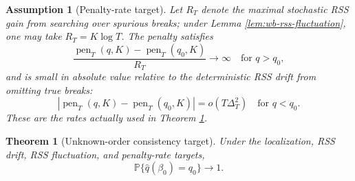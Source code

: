 \documentclass[12pt]{article}
\numberwithin{equation}{section}
\newtheorem{theorem}{Theorem}
\newtheorem{assumption}{Assumption}
\theoremstyle{definition}
\newcommand{\Pp}{\mathbb P}
\begin{document}
\begin{assumption}[Penalty-rate target]
\label{ass:wb-penalty}
Let \(R_T\) denote the maximal stochastic RSS gain from searching over
spurious breaks; under Lemma \ref{lem:wb-rss-fluctuation}, one may take
\(R_T=K\log T\).  The penalty satisfies
\[
    \frac{\operatorname{pen}_T(q,K)-\operatorname{pen}_T(q_0,K)}{R_T}
    \to\infty
    \quad\text{for }q>q_0,
\]
and is small in absolute value relative to the deterministic RSS drift from
omitting true breaks:
\[
    \left|\operatorname{pen}_T(q,K)-\operatorname{pen}_T(q_0,K)\right|
    =o(T\Delta_T^2)
    \quad\text{for }q<q_0.
\]
These are the rates actually used in Theorem \ref{thm:wb-order}.
\end{assumption}

\begin{theorem}[Unknown-order consistency target]
\label{thm:wb-order}
Under the localization, RSS drift, RSS fluctuation, and penalty-rate targets,
\[
    \Pp\{\widehat q(\beta_0)=q_0\}\to1.
\]
\end{theorem}
\end{document}
